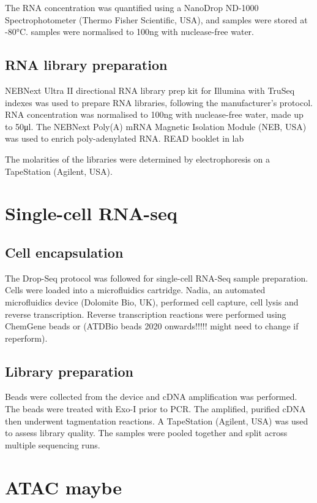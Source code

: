 The RNA concentration was quantified using a NanoDrop ND-1000 Spectrophotometer (Thermo Fisher Scientific, USA), and samples were stored at -80\si{\degreeCelsius}.
samples were normalised to 100\si{\ng} with nuclease-free water.


\subsection{RNA library preparation}
NEBNext\textsuperscript{\textregistered} Ultra II directional RNA library prep kit for Illumina\textsuperscript{\textregistered} with TruSeq indexes was used to prepare RNA libraries, following the manufacturer's protocol.
RNA concentration was normalised to 100\si{\ng} with nuclease-free water, made up to 50\si{\ul}.
The NEBNext Poly(A) mRNA Magnetic Isolation Module (NEB, USA) was used to enrich poly-adenylated RNA. READ booklet in lab


The molarities of the libraries were determined by electrophoresis on a TapeStation (Agilent, USA).

\section{Single-cell RNA-seq}
\subsection{Cell encapsulation}
The Drop-Seq protocol\cite{macosko2015highly} was followed for single-cell RNA-Seq sample preparation.
Cells were loaded into a microfluidics cartridge.
Nadia, an automated microfluidics device (Dolomite Bio, UK), performed cell capture, cell lysis and reverse transcription.
Reverse transcription reactions were performed using ChemGene beads or (ATDBio beads 2020 onwards!!!!! might need to change if reperform).

\subsection{Library preparation}
Beads were collected from the device and cDNA amplification was performed.
The beads were treated with Exo-I prior to PCR.
The amplified, purified cDNA then underwent tagmentation reactions.
A TapeStation (Agilent, USA) was used to assess library quality.
The samples were pooled together and split across multiple sequencing runs.


\section{ATAC maybe}
